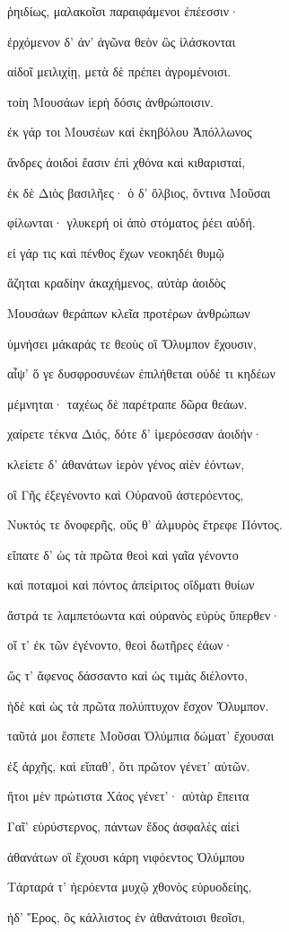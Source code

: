 \begin{pages}
\begin{Leftside}
ῥηιδίως, μαλακοῖσι παραιφάμενοι ἐπέεσσιν·  

ἐρχόμενον δ' ἀν' ἀγῶνα θεὸν ὣς ἱλάσκονται

αἰδοῖ μειλιχίῃ, μετὰ δὲ πρέπει ἀγρομένοισι. 

τοίη Μουσάων ἱερὴ δόσις ἀνθρώποισιν.

ἐκ γάρ τοι Μουσέων καὶ ἑκηβόλου Ἀπόλλωνος

ἄνδρες ἀοιδοὶ ἔασιν ἐπὶ χθόνα καὶ κιθαρισταί, 

ἐκ δὲ Διὸς βασιλῆες· ὁ δ' ὄλβιος, ὅντινα Μοῦσαι

φίλωνται· γλυκερή οἱ ἀπὸ στόματος ῥέει αὐδή. 

εἰ γάρ τις καὶ πένθος ἔχων νεοκηδέι θυμῷ

ἄζηται κραδίην ἀκαχήμενος, αὐτὰρ ἀοιδὸς

Μουσάων θεράπων κλεῖα προτέρων ἀνθρώπων  

ὑμνήσει μάκαράς τε θεοὺς οἳ Ὄλυμπον ἔχουσιν, 

αἶψ' ὅ γε δυσφροσυνέων ἐπιλήθεται οὐδέ τι κηδέων

μέμνηται· ταχέως δὲ παρέτραπε δῶρα θεάων. 

χαίρετε τέκνα Διός, δότε δ' ἱμερόεσσαν ἀοιδήν· 

κλείετε δ' ἀθανάτων ἱερὸν γένος αἰὲν ἐόντων, 

οἳ Γῆς ἐξεγένοντο καὶ Οὐρανοῦ ἀστερόεντος,

Νυκτός τε δνοφερῆς, οὕς θ' ἁλμυρὸς ἔτρεφε Πόντος.

εἴπατε δ' ὡς τὰ πρῶτα θεοὶ καὶ γαῖα γένοντο 

καὶ ποταμοὶ καὶ πόντος ἀπείριτος οἴδματι θυίων 

ἄστρά τε λαμπετόωντα καὶ οὐρανὸς εὐρὺς ὕπερθεν·  

οἵ τ' ἐκ τῶν ἐγένοντο, θεοὶ δωτῆρες ἐάων· 

ὥς τ' ἄφενος δάσσαντο καὶ ὡς τιμὰς διέλοντο, 

ἠδὲ καὶ ὡς τὰ πρῶτα πολύπτυχον ἔσχον Ὄλυμπον.

ταῦτά μοι ἔσπετε Μοῦσαι Ὀλύμπια δώματ' ἔχουσαι 

ἐξ ἀρχῆς, καὶ εἴπαθ', ὅτι πρῶτον γένετ' αὐτῶν. 

ἤτοι μὲν πρώτιστα Χάος γένετ'· αὐτὰρ ἔπειτα

Γαῖ' εὐρύστερνος, πάντων ἕδος ἀσφαλὲς αἰεὶ

ἀθανάτων οἳ ἔχουσι κάρη νιφόεντος Ὀλύμπου 

Τάρταρά τ' ἠερόεντα μυχῷ χθονὸς εὐρυοδείης,

ἠδ' Ἔρος, ὃς κάλλιστος ἐν ἀθανάτοισι θεοῖσι, 


\end{Leftside}
\end{pages}
